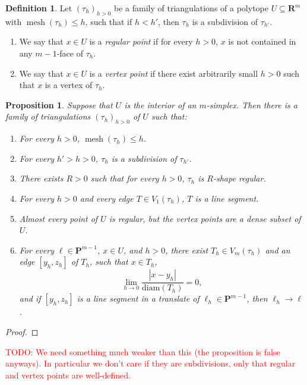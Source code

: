 \documentclass[reqno,11pt]{amsart}
\newcommand{\RR}{\mathbf{R}}
\newcommand{\PP}{\mathbf P}
\DeclareMathOperator{\mesh}{mesh}
\newcommand{\diam}{\mathrm{diam}}
\newcommand{\dfn}[1]{\emph{#1}\index{#1}}
\newtheorem{proposition}[theorem]{Proposition}
\theoremstyle{definition}
\newtheorem{definition}[theorem]{Definition}
\numberwithin{equation}{section}
\newcommand\todo[1]{\textcolor{red}{TODO: #1}}
\begin{document}
\begin{definition}
Let $(\tau_h)_{h > 0}$ be a family of triangulations of a polytope $U \subseteq \RR^m$ with $\mesh(\tau_h) \leq h$, such that if $h < h'$, then $\tau_h$ is a subdivision of $\tau_{h'}$.
\begin{enumerate}
\item We say that $x \in U$ is a \dfn{regular point} if for every $h > 0$, $x$ is not contained in any $m - 1$-face of $\tau_h$.
\item We say that $x \in U$ is a \dfn{vertex point} if there exist arbitrarily small $h > 0$ such that $x$ is a vertex of $\tau_h$.
\end{enumerate}
\end{definition}

\begin{proposition}
Suppose that $U$ is the interior of an $m$-simplex.
Then there is a family of triangulations $(\tau_h)_{h > 0}$ of $U$ such that:
\begin{enumerate}
\item For every $h > 0$, $\mesh(\tau_h) \leq h$.
\item For every $h' > h > 0$, $\tau_h$ is a subdivision of $\tau_{h'}$.
\item There exists $R > 0$ such that for every $h > 0$, $\tau_h$ is $R$-shape regular.
\item For every $h > 0$ and every edge $T \in V_1(\tau_h)$, $T$ is a line segment.
\item Almost every point of $U$ is regular, but the vertex points are a dense subset of $U$.
\item For every $\ell \in \PP^{m - 1}$, $x \in U$, and $h > 0$, there exist $T_h \in V_m(\tau_h)$ and an edge $[y_h, z_h]$ of $T_h$, such that $x \in T_h$,
$$\lim_{h \to 0} \frac{|x - y_h|}{\diam(T_h)} = 0,$$
and if $[y_h, z_h]$ is a line segment in a translate of $\ell_h \in \PP^{m - 1}$, then $\ell_h \to \ell$.
\end{enumerate}
\end{proposition}
\begin{proof}
\end{proof}

\todo{We need something much weaker than this (the proposition is false anyways). In particular we don't care if they are subdivisions, only that regular and vertex points are well-defined.}

\end{document}
